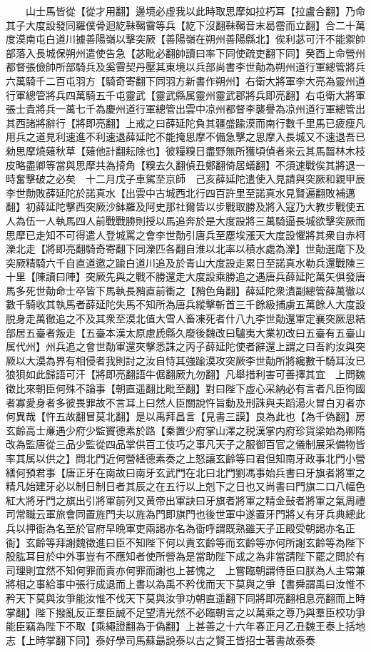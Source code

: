 　　山士馬皆從【從才用翻】邊境必虛我以此時取思摩如拉朽耳【拉盧合翻】乃命其子大度設發同羅僕骨迴紇靺鞨霫等兵【紇下沒翻靺鞨音末曷霤而立翻】合二十萬度漠南屯白道川據善陽嶺以擊突厥【善陽嶺在朔州善陽縣北】俟利苾可汗不能禦帥部落入長城保朔州遣使告急【苾毗必翻帥讀曰率下同使疏吏翻下同】癸酉上命營州都督張儉帥所部騎兵及奚霫契丹壓其東境以兵部尚書李世勣為朔州道行軍總管將兵六萬騎千二百屯羽方【騎奇寄翻下同羽方新書作朔州】右衛大將軍李大亮為靈州道行軍總管將兵四萬騎五千屯靈武【靈武縣属靈州靈武郡將兵即亮翻】右屯衛大將軍張士貴將兵一萬七千為慶州道行軍總管出雲中凉州都督李襲譽為凉州道行軍總管出其西諸將辭行【將即亮翻】上戒之曰薛延陀負其疆盛踰漠而南行數千里馬已疲瘦凡用兵之道見利速進不利速退薛延陀不能掩思摩不備急擊之思摩入長城又不速退吾已勑思摩燒薙秋草【薙他計翻耘除也】彼糧糗日盡野無所獲頃偵者來云其馬齧林木枝皮略盡卿等當與思摩共為掎角【糗去久翻偵丑鄭翻倚居蟻翻】不須速戰俟其將退一時奮擊破之必矣　十二月戊子車駕至京師　己亥薛延陀遣使入見請與突厥和親甲辰李世勣敗薛延陀於諾真水【出雲中古城西北行四百許里至諾真水見賢遍翻敗補邁翻】初薛延陀擊西突厥沙鉢羅及阿史那社爾皆以步戰取勝及將入寇乃大教步戰使五人為伍一人執馬四人前戰戰勝則授以馬追奔於是大度設將三萬騎逼長城欲擊突厥而思摩已走知不可得遣人登城罵之會李世勣引唐兵至塵埃漲天大度設懼將其衆自赤柯濼北走【將即亮翻騎奇寄翻下同濼匹各翻自淮以北率以積水處為濼】世勣選麾下及突厥精騎六千自直道邀之踰白道川追及於青山大度設走累日至諾真水勒兵還戰陳三十里【陳讀曰陣】突厥先與之戰不勝還走大度設乘勝追之遇唐兵薛延陀萬矢俱發唐馬多死世勣命士卒皆下馬執長矟直前衝之【矟色角翻】薛延陀衆潰副總管薛萬徹以數千騎收其執馬者薛延陀失馬不知所為唐兵縱擊斬首三千餘級捕虜五萬餘人大度設脱身走萬徹追之不及其衆至漠北值大雪人畜凍死者什八九李世勣還軍定襄突厥思結部居五臺者叛走【五臺本漢太原慮虒縣久廢後魏改曰驢夷大業初改曰五臺有五臺山属代州】州兵追之會世勣軍還夾擊悉誅之丙子薛延陀使者辭還上謂之曰吾約汝與突厥以大漠為界有相侵者我則討之汝自恃其強踰漠攻突厥李世勣所將纔數千騎耳汝已狼狽如此歸語可汗【將即亮翻語牛倨翻厥九勿翻】凡舉措利害可善擇其宜　上問魏徵比來朝臣何殊不論事【朝直遥翻比毗至翻】對曰陛下虛心采納必有言者凡臣徇國者寡愛身者多彼畏罪故不言耳上曰然人臣關說忤旨動及刑誅與夫蹈湯火冒白刃者亦何異哉【忤五故翻冒莫北翻】是以禹拜昌言【見書三謨】良為此也【為千偽翻】房玄齡高士亷遇少府少監竇德素於路【秦置少府掌山澤之税漢掌内府珍貨梁始為卿隋改為監唐從三品少監從四品掌供百工伎巧之事凡天子之服御百官之儀制展采備物皆率其属以供之】問北門近何營繕德素奏之上怒讓玄齡等曰君但知南牙政事北門小營繕何預君事【唐正牙在南故曰南牙玄武門在北曰北門劉馮事始兵書曰牙旗者將軍之精凡始建牙必以制日制日者其辰之在五行以上剋下之日也又尚書曰門旗二口八幅色紅大將牙門之旗出引將軍前列又黄帝出軍訣曰牙旗者將軍之精金鼔者將軍之氣周禮司常職云軍旅會同置旌門夫以旌為門即旗門也後世軍中遂置牙門將乂有牙兵典總此兵以押衙為名至於官府早晩軍吏兩謁亦名為衙呼謂既熟雖天子正殿受朝謁亦名正衙】玄齡等拜謝魏徵進曰臣不知陛下何以責玄齡等而玄齡等亦何所謝玄齡等為陛下股肱耳目於中外事豈有不應知者使所營為是當助陛下成之為非當請陛下罷之問於有司理則宜然不知何罪而責亦何罪而謝也上甚愧之　上嘗臨朝謂侍臣曰朕為人主常兼將相之事給事中張行成退而上書以為禹不矜伐而天下莫與之爭【書舜謂禹曰汝惟不矜天下莫與汝爭能汝惟不伐天下莫與汝爭功朝直遥翻下同將即亮翻相息亮翻而上時掌翻】陛下撥亂反正羣臣誠不足望清光然不必臨朝言之以萬乘之尊乃與羣臣校功爭能臣竊為陛下不取【乘繩證翻為于偽翻】上甚善之十六年春正月乙丑魏王泰上括地志【上時掌翻下同】泰好學司馬蘇朂說泰以古之賢王皆招士著書故泰奏